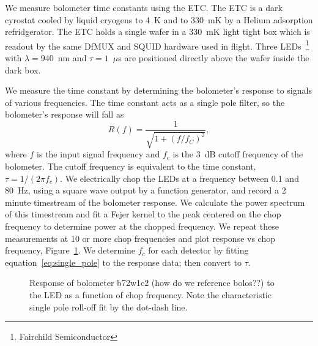 \documentclass[../EBEXPaper2.tex]{subfiles}
\begin{document}
\label{sec:LED_tau}  


We measure bolometer time constants using the \ac{ETC}.  The \ac{ETC} is a dark cyrostat cooled by 
liquid cryogens to 4~K and to 330~mK by a Helium adsorption refridgerator.  The \ac{ETC} holds a single wafer in a 330~mK light 
tight box which is readout by the same DfMUX and \ac{SQUID} hardware used in flight.  Three \ac{LED}s~\footnote{Fairchild Semiconductor} with 
$\lambda = 940$~nm and $\tau = 1$~$\mu$s are positioned directly above the wafer inside the dark box.  

We measure the time constant by determining the bolometer's response to signals of various frequencies.  The time constant 
acts as a single pole filter, so the bolometer's response will fall as
\begin{equation}
R(f) = \frac{1}{\sqrt{1+(f/f_C)^2}},   %
\end{equation} \label{eq:single_pole}
where $f$ is the input signal frequency and $f_c$ is the 3~dB cutoff frequency of the bolometer.  The cutoff frequency is 
equivalent to the time constant, $\tau = 1/(2\pi f_c)$.
We electrically chop the \ac{LED}s at a frequency between 0.1 and 80~Hz, using a square wave output by a function generator, and 
record a 2 minute timestream of the bolometer response.  We calculate the power spectrum of this timestream and fit a Fejer 
kernel \citep{Weisse_FejerKernal2006} to the peak centered on the chop frequency to determine power at the chopped 
frequency.  We repeat these measurements at 10 or more chop frequencies and plot response vs chop frequency, 
Figure~\ref{fig:LED_response}.  We determine 
$f_c$ for each detector by fitting equation~\ref{eq:single_pole} to the response data; then convert to $\tau$.  

\begin{figure}[ht]
\caption{Response of bolometer b72w1c2 (how do we reference bolos??) to the \ac{LED} as a function of chop frequency.  Note the 
         characteristic single pole roll-off fit by the dot-dash line.  }
\label{fig:LED_response}
\end{figure}
\end{document}
